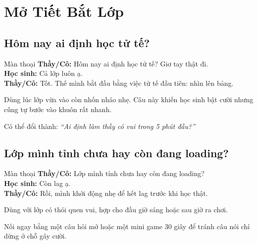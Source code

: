 \chapter{Mở Tiết Bắt Lớp}

\section{Hôm nay ai định học tử tế?}
\begin{manthoai}{Màn thoại}
\textbf{Thầy/Cô:} Hôm nay ai định học tử tế? Giơ tay thật đi.\\
\textbf{Học sinh:} Cả lớp luôn ạ.\\
\textbf{Thầy/Cô:} Tốt. Thế mình bắt đầu bằng việc tử tế đầu tiên: nhìn lên bảng.
\end{manthoai}
\begin{dungkhinào}
Dùng lúc lớp vừa vào còn nhốn nháo nhẹ. Câu này khiến học sinh bật cười nhưng cũng tự bước vào khuôn rất nhanh.
\end{dungkhinào}
\begin{nhipthem}
Có thể đổi thành: \textit{``Ai định làm thầy cô vui trong 5 phút đầu?''}
\end{nhipthem}
\ngancach

\section{Lớp mình tỉnh chưa hay còn đang loading?}
\begin{manthoai}{Màn thoại}
\textbf{Thầy/Cô:} Lớp mình tỉnh chưa hay còn đang loading?\\
\textbf{Học sinh:} Còn lag ạ.\\
\textbf{Thầy/Cô:} Rồi, mình khởi động nhẹ để hết lag trước khi học thật.
\end{manthoai}
\begin{dungkhinào}
Dùng với lớp có thói quen vui, hợp cho đầu giờ sáng hoặc sau giờ ra chơi.
\end{dungkhinào}
\begin{nhipthem}
Nối ngay bằng một câu hỏi mở hoặc một mini game 30 giây để tránh câu nói chỉ dừng ở chỗ gây cười.
\end{nhipthem}
\ngancach


